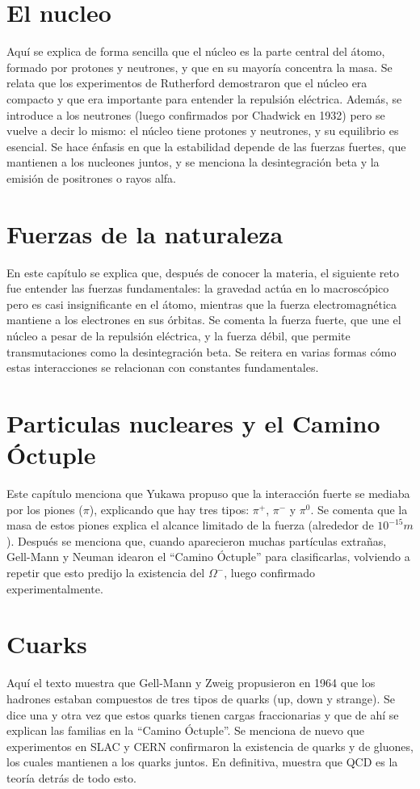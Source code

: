 \documentclass[12pt]{article}
\begin{document}
\section{El nucleo}
Aquí se explica de forma sencilla que el núcleo es la parte central del átomo, formado por protones y neutrones, y que en su mayoría concentra la masa. Se relata que los experimentos de Rutherford demostraron que el núcleo era compacto y que era importante para entender la repulsión eléctrica. Además, se introduce a los neutrones (luego confirmados por Chadwick en 1932) pero se vuelve a decir lo mismo: el núcleo tiene protones y neutrones, y su equilibrio es esencial. Se hace énfasis en que la estabilidad depende de las fuerzas fuertes, que mantienen a los nucleones juntos, y se menciona la desintegración beta y la emisión de positrones o rayos alfa.

\section{Fuerzas de la naturaleza}
En este capítulo se explica que, después de conocer la materia, el siguiente reto fue entender las fuerzas fundamentales: la gravedad actúa en lo macroscópico pero es casi insignificante en el átomo, mientras que la fuerza electromagnética mantiene a los electrones en sus órbitas. Se comenta la fuerza fuerte, que une el núcleo a pesar de la repulsión eléctrica, y la fuerza débil, que permite transmutaciones como la desintegración beta. Se reitera en varias formas cómo estas interacciones se relacionan con constantes fundamentales.

\section{Particulas nucleares y el Camino Óctuple}
Este capítulo menciona que Yukawa propuso que la interacción fuerte se mediaba por los piones ($\pi$), explicando que hay tres tipos: $\pi^{+}$, $\pi^{-}$ y $\pi^{0}$. Se comenta que la masa de estos piones explica el alcance limitado de la fuerza (alrededor de $10^{-15} m$). Después se menciona que, cuando aparecieron muchas partículas extrañas, Gell-Mann y Neuman idearon el “Camino Óctuple” para clasificarlas, volviendo a repetir que esto predijo la existencia del $\Omega^{-}$, luego confirmado experimentalmente.

\section{Cuarks}
Aquí el texto muestra que Gell-Mann y Zweig propusieron en 1964 que los hadrones estaban compuestos de tres tipos de quarks (up, down y strange). Se dice una y otra vez que estos quarks tienen cargas fraccionarias y que de ahí se explican las familias en la “Camino Óctuple”. Se menciona de nuevo que experimentos en SLAC y CERN confirmaron la existencia de quarks y de gluones, los cuales mantienen a los quarks juntos. En definitiva, muestra que QCD es la teoría detrás de todo esto.
\end{document}
